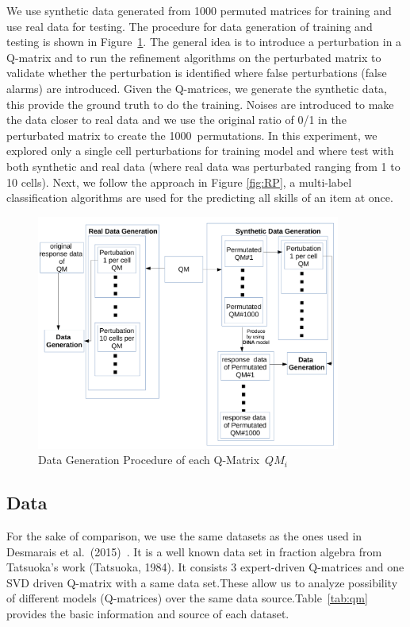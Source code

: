 \documentclass[12pt]{article}
\begin{document}
 We use synthetic data generated from 1000 permuted matrices for training  and use real data for testing. The procedure for data generation of training and testing is shown in Figure~\ref{fig:DG}. The general idea is to introduce a perturbation in a Q-matrix and to run the refinement algorithms on the perturbated matrix to validate whether the perturbation is identified where false perturbations (false alarms) are introduced. Given the Q-matrices, we generate the synthetic data, this provide the ground truth to do the training.  Noises are introduced to make the data closer to real data and we use the original ratio of 0/1 in the perturbated matrix to create the 1000~permutations. In this experiment, we explored only a single cell perturbations for training model and where test with both synthetic and real data (where real data was perturbated ranging from 1 to 10 cells).
Next, we follow the approach in Figure \ref{fig:RP}, a multi-label classification algorithms are used for the predicting all skills of an item at once. 
\begin{figure}
  \centering
    \includegraphics[width=100mm ,scale=0.5]{graph/DG.pdf}
  \caption{Data Generation Procedure of each Q-Matrix~$QM_i$}  \label{fig:DG}
\end{figure}
 
\subsection{Data}
For the sake of comparison, we use the same datasets as the ones used in Desmarais et al.\ (2015)~\cite{tatsuoka1983rule,desmarais2015combining}. It is a well known data set in
fraction algebra from Tatsuoka's work (Tatsuoka, 1984)\cite{tatsuoka1983rule}. It consists 3 expert-driven Q-matrices and one SVD driven Q-matrix with a same data set.These allow us to analyze possibility of different models (Q-matrices) over the same data source.Table~\ref{tab:qm} provides the basic information and source of each dataset.   
\end{document}

